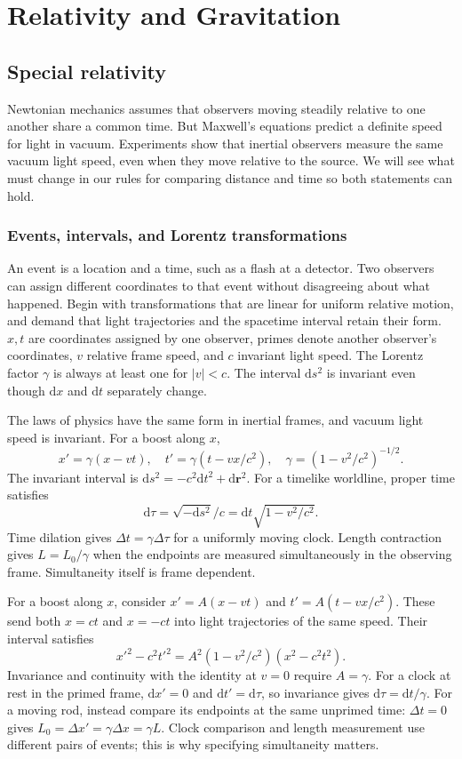 \documentclass[11pt,oneside]{book}
\newcommand{\dd}{\mathrm{d}}
\newcommand{\vect}[1]{\boldsymbol{#1}}
\theoremstyle{reviewstyle}
\begin{document}
\part{Relativity and Gravitation}
\chapter{Special relativity}
Newtonian mechanics assumes that observers moving steadily relative to one another share a common time. But Maxwell's equations predict a definite speed for light in vacuum. Experiments show that inertial observers measure the same vacuum light speed, even when they move relative to the source. We will see what must change in our rules for comparing distance and time so both statements can hold.

\section{Events, intervals, and Lorentz transformations}
An event is a location and a time, such as a flash at a detector. Two observers can assign different coordinates to that event without disagreeing about what happened. Begin with transformations that are linear for uniform relative motion, and demand that light trajectories and the spacetime interval retain their form. $x,t$ are coordinates assigned by one observer, primes denote another observer's coordinates, $v$ relative frame speed, and $c$ invariant light speed. The Lorentz factor $\gamma$ is always at least one for $|v|<c$. The interval $\dd s^2$ is invariant even though $\dd x$ and $\dd t$ separately change.

The laws of physics have the same form in inertial frames, and vacuum light speed is invariant. For a boost along $x$,
\begin{equation}
x'=\gamma(x-vt),\quad t'=\gamma(t-vx/c^2),\quad
\gamma=(1-v^2/c^2)^{-1/2}.
\end{equation}
The invariant interval is $\dd s^2=-c^2\dd t^2+\dd\vect r^2$. For a timelike worldline, proper time satisfies
\begin{equation}\dd\tau=\sqrt{-\dd s^2}/c=\dd t\sqrt{1-v^2/c^2}.\end{equation}
Time dilation gives $\Delta t=\gamma\Delta\tau$ for a uniformly moving clock. Length contraction gives $L=L_0/\gamma$ when the endpoints are measured simultaneously in the observing frame. Simultaneity itself is frame dependent.

For a boost along $x$, consider $x'=A(x-vt)$ and $t'=A(t-vx/c^2)$. These send both $x=ct$ and $x=-ct$ into light trajectories of the same speed. Their interval satisfies
\begin{equation}
x'^2-c^2t'^2=A^2(1-v^2/c^2)(x^2-c^2t^2).
\end{equation}
Invariance and continuity with the identity at $v=0$ require $A=\gamma$. For a clock at rest in the primed frame, $\dd x'=0$ and $\dd t'=\dd\tau$, so invariance gives $\dd\tau=\dd t/\gamma$. For a moving rod, instead compare its endpoints at the same unprimed time: $\Delta t=0$ gives $L_0=\Delta x'=\gamma\Delta x=\gamma L$. Clock comparison and length measurement use different pairs of events; this is why specifying simultaneity matters.
\end{document}
